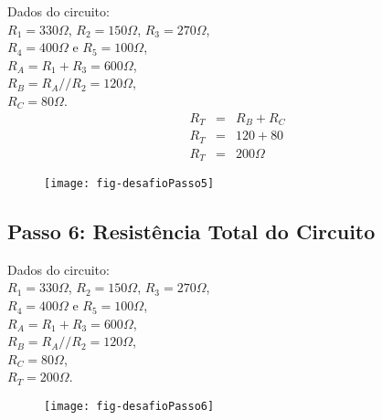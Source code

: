 \begin{minipage}{\linewidth}
  \centering
  \begin{minipage}{0.45\linewidth}
    Dados do circuito: \\
                $R_1 = 330\Omega$,
                $R_2 = 150\Omega$,
                $R_3 = 270\Omega$, \\
                $R_4 = 400\Omega$ e
                $R_5 = 100\Omega$,\\
                $R_A = R_1 + R_3 = 600\Omega$, \\
                $R_B = R_A // R_2 = 120\Omega$, \\
                $R_C = 80\Omega$.
        \begin{eqnarray}
          R_T & = & R_B + R_C \nonumber\\
          R_T & = & 120 + 80 \nonumber\\
          R_T & = & 200\Omega \nonumber
        \end{eqnarray}

  \end{minipage}
  \hspace{0.05\linewidth}
  \begin{minipage}{0.45\linewidth}
    \begin{figure}[H]
      \centering
      \texttt{[image: fig-desafioPasso5]}
    \end{figure}
  \end{minipage}
\end{minipage}



\subsection{Passo 6: Resistência Total do Circuito}

\begin{minipage}{\linewidth}
  \centering
  \begin{minipage}{0.45\linewidth}
    Dados do circuito: \\
                $R_1 = 330\Omega$,
                $R_2 = 150\Omega$,
                $R_3 = 270\Omega$, \\
                $R_4 = 400\Omega$ e
                $R_5 = 100\Omega$,\\
                $R_A = R_1 + R_3 = 600\Omega$, \\
                $R_B = R_A // R_2 = 120\Omega$, \\
                $R_C = 80\Omega$, \\
                $R_T = 200\Omega$.
  \end{minipage}
  \hspace{0.05\linewidth}
  \begin{minipage}{0.45\linewidth}
    \begin{figure}[H]
      \centering
      \texttt{[image: fig-desafioPasso6]}
    \end{figure}
  \end{minipage}
\end{minipage}
